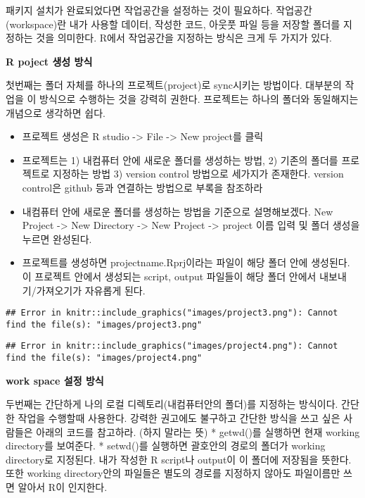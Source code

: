\documentclass[
]{book}
\providecommand{\tightlist}{%
  \setlength{\itemsep}{0pt}\setlength{\parskip}{0pt}}
\theoremstyle{definition}
\theoremstyle{definition}
\theoremstyle{definition}
\theoremstyle{definition}
\theoremstyle{remark}
\begin{document}
패키지 설치가 완료되었다면 작업공간을 설정하는 것이 필요하다. 작업공간(workspace)란 내가 사용할 데이터, 작성한 코드, 아웃풋 파일 등을 저장할 폴더를 지정하는 것을 의미한다. R에서 작업공간을 지정하는 방식은 크게 두 가지가 있다.

\textbf{R poject 생성 방식}

첫번째는 폴더 자체를 하나의 프로젝트(project)로 sync시키는 방법이다. 대부분의 작업을 이 방식으로 수행하는 것을 강력히 권한다. 프로젝트는 하나의 폴더와 동일해지는 개념으로 생각하면 쉽다.

\begin{itemize}
\tightlist
\item
  프로젝트 생성은 R studio -\textgreater{} File -\textgreater{} New project를 클릭
\item
  프로젝트는 1) 내컴퓨터 안에 새로운 폴더를 생성하는 방법, 2) 기존의 폴더를 프로젝트로 지정하는 방법 3) version control 방법으로 세가지가 존재한다. version control은 github 등과 연결하는 방법으로 부록을 참조하라
\item
  내컴퓨터 안에 새로운 폴더를 생성하는 방법을 기준으로 설명해보겠다. New Project -\textgreater{} New Directory -\textgreater{} New Project -\textgreater{} project 이름 입력 및 폴더 생성을 누르면 완성된다.
\item
  프로젝트를 생성하면 projectname.Rprj이라는 파일이 해당 폴더 안에 생성된다. 이 프로젝트 안에서 생성되는 script, output 파일들이 해당 폴더 안에서 내보내기/가져오기가 자유롭게 된다.
\end{itemize}

\begin{verbatim}
## Error in knitr::include_graphics("images/project3.png"): Cannot find the file(s): "images/project3.png"
\end{verbatim}

\begin{verbatim}
## Error in knitr::include_graphics("images/project4.png"): Cannot find the file(s): "images/project4.png"
\end{verbatim}

\textbf{work space 설정 방식}

두번째는 간단하게 나의 로컬 디렉토리(내컴퓨터안의 폴더)를 지정하는 방식이다. 간단한 작업을 수행할때 사용한다. 강력한 권고에도 불구하고 간단한 방식을 쓰고 싶은 사람들은 아래의 코드를 참고하라. (하지 말라는 뜻)
* getwd()를 실행하면 현재 working directory를 보여준다.
* setwd()를 실행하면 괄호안의 경로의 폴더가 working directory로 지정된다. 내가 작성한 R script나 output이 이 폴더에 저장됨을 뜻한다. 또한 working directory안의 파일들은 별도의 경로를 지정하지 않아도 파일이름만 쓰면 알아서 R이 인지한다.
\end{document}
